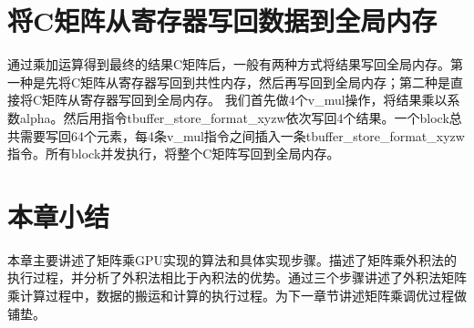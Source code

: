 \section{将C矩阵从寄存器写回数据到全局内存}

通过乘加运算得到最终的结果C矩阵后，一般有两种方式将结果写回全局内存。第一种是先将C矩阵从寄存器写回到共性内存，然后再写回到全局内存；第二种是直接将C矩阵从寄存器写回到全局内存。
我们首先做4个v\_mul操作，将结果乘以系数alpha。然后用指令tbuffer\_store\_format\_xyzw依次写回4个结果。一个block总共需要写回64个元素，每4条v\_mul指令之间插入一条tbuffer\_store\_format\_xyzw指令。所有block并发执行，将整个C矩阵写回到全局内存。


\section{本章小结}
本章主要讲述了矩阵乘GPU实现的算法和具体实现步骤。描述了矩阵乘外积法的执行过程，并分析了外积法相比于內积法的优势。通过三个步骤讲述了外积法矩阵乘计算过程中，数据的搬运和计算的执行过程。为下一章节讲述矩阵乘调优过程做铺垫。